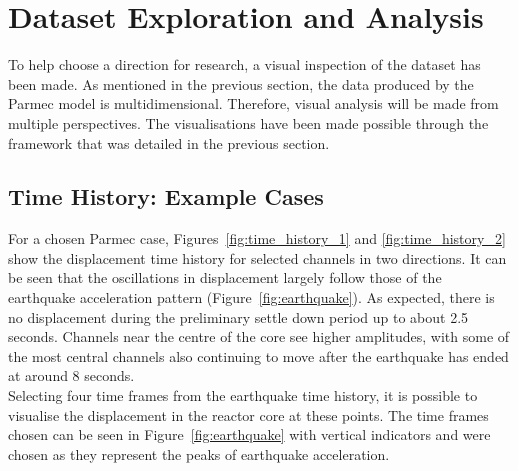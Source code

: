 \section{Dataset Exploration and Analysis} \label{data:visualisation}

To help choose a direction for research, a visual inspection of the dataset has been made. As mentioned in the previous section, the data produced by the Parmec model is multidimensional. Therefore, visual analysis will be made from multiple perspectives. The visualisations have been made possible through the framework that was detailed in the previous section. 

\subsection{Time History: Example Cases}


For a chosen Parmec case, Figures~\ref{fig:time_history_1} and \ref{fig:time_history_2} show the displacement time history for selected channels in two directions. It can be seen that the oscillations in displacement largely follow those of the earthquake acceleration pattern (Figure~\ref{fig:earthquake}). As expected, there is no displacement during the preliminary settle down period up to about 2.5 seconds. Channels near the centre of the core see higher amplitudes, with some of the most central channels also continuing to move after the earthquake has ended at around 8 seconds.  
\\

\noindent
Selecting four time frames from the earthquake time history, it is possible to visualise the displacement in the reactor core at these points. The time frames chosen can be seen in Figure~\ref{fig:earthquake} with vertical indicators and were chosen as they represent the peaks of earthquake acceleration. 
\\

